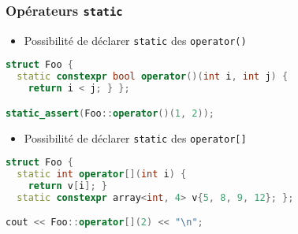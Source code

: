 \documentclass[C++.tex]{subfiles}
\begin{document}
\begin{frame}[fragile]
	\frametitle{Opérateurs \lstinline|static|}
	 \begin{itemize}
	 	\item Possibilité de déclarer \lstinline|static| des \lstinline|operator()|
	 \end{itemize}

 	\begin{lstlisting}[language=C++]
struct Foo {
  static constexpr bool operator()(int i, int j) {
    return i < j; } };

static_assert(Foo::operator()(1, 2));\end{lstlisting}

	 \begin{itemize}
	 	\item Possibilité de déclarer \lstinline|static| des \lstinline|operator[]|
	 \end{itemize}

 	\begin{lstlisting}[language=C++]
struct Foo {
  static int operator[](int i) {
    return v[i]; }
  static constexpr array<int, 4> v{5, 8, 9, 12}; };

cout << Foo::operator[](2) << "\n";\end{lstlisting}


\end{frame}
\end{document}
